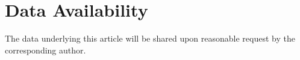 \documentclass[fleqn,usenatbib]{mnras}
\begin{document}
\section*{Data Availability}
The data underlying this article will be shared upon reasonable request by the corresponding author.












\bsp	%
\label{lastpage}
\end{document}
